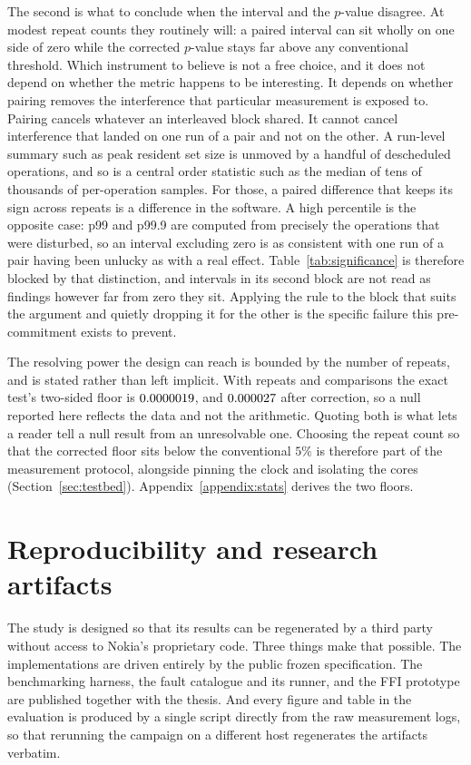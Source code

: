 \documentclass[english,twoside,openright,a4paper,censored,csm,software-track-2020]{HYthesisML}
\begin{document}
The second is what to conclude when the interval and the $p$-value disagree. At modest repeat
counts they routinely will: a paired interval can sit wholly on one side of zero while the
corrected $p$-value stays far above any conventional threshold. Which instrument to believe
is not a free choice, and it does not depend on whether the metric happens to be interesting. It
depends on whether pairing removes the interference that particular measurement is exposed to.
Pairing cancels whatever an interleaved block shared. It cannot cancel interference that landed
on one run of a pair and not on the other. A run-level summary such as peak resident set size is
unmoved by a handful of descheduled operations, and so is a central order statistic such as the
median of tens of thousands of per-operation samples. For those, a paired difference that keeps
its sign across repeats is a difference in the software. A high percentile is the
opposite case: p99 and p99.9 are computed from precisely the operations that were disturbed, so
an interval excluding zero is as consistent with one run of a pair having been unlucky as with a
real effect. Table~\ref{tab:significance} is therefore blocked by that distinction, and
intervals in its second block are not read as findings however far from zero they sit. Applying
the rule to the block that suits the argument and quietly dropping it for the other is the
specific failure this pre-commitment exists to prevent.

The resolving power the design can reach is bounded by the number of repeats, and is stated
rather than left implicit. With \NRepeats{} repeats and \NTests{} comparisons the exact test's
two-sided floor is $0.0000019$, and $0.000027$ after correction, so a null reported
here reflects the data and not the arithmetic. Quoting both is what lets a reader tell a null
result from an unresolvable one. Choosing the repeat count so that the corrected floor sits below
the conventional $5\%$ is therefore part of the measurement protocol, alongside pinning the clock
and isolating the cores (Section~\ref{sec:testbed}). Appendix~\ref{appendix:stats} derives the two
floors.

\section{Reproducibility and research artifacts}\label{sec:repro}
The study is designed so that its results can be regenerated by a third party without access to
Nokia's proprietary code. Three things make that possible. The implementations are driven
entirely by the public frozen specification. The benchmarking harness, the fault catalogue and
its runner, and the FFI prototype are published together with the thesis. And every figure and
table in the evaluation is produced by a single script directly from the raw measurement logs,
so that rerunning the campaign on a different host regenerates the artifacts verbatim.
\end{document}
